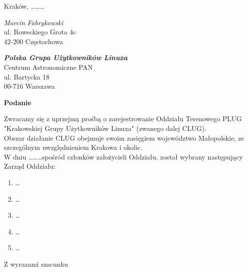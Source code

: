 \documentclass[a4paper,12pt]{article}
\begin{document}
\thispagestyle{empty}
\flushright
Kraków, \ldots \ldots \ldots


\flushleft
\emph{Marcin Fabrykowski}\\
ul. Roweckiego Grota 4c\\
42-200 Częstochowa

\flushright
\textbf{\emph{Polska Grupa Użytkowników Linuxa}}\\
Centrum Astronomiczne PAN\\
ul. Bartycka 18\\
00-716 Warszawa\\


\begin{center}\Large{\textbf{Podanie}}\end{center}

Zwracamy się z uprzejmą prośbą o zarejestrowanie Oddziału Terenowego PLUG "Krakowskiej Grupy Użytkowników Linuxa" (zwanego dalej CLUG).\\
Obszar działanie CLUG obejmuje swoim zasięgiem województwo Małopolskie, ze szczególnym uwzględnieniem Krakowa i okolic.\\
W dniu \ldots \ldots\ldots spośród członków założycieli Oddziału, został wybrany następujący Zarząd Oddziału:
\begin{enumerate}
\item \ldots
\item \ldots 
\item \ldots
\item \ldots
\item \ldots
\end{enumerate}

\begin{flushright}
Z wyrazami szacunku
\end{flushright}



\end{document}
